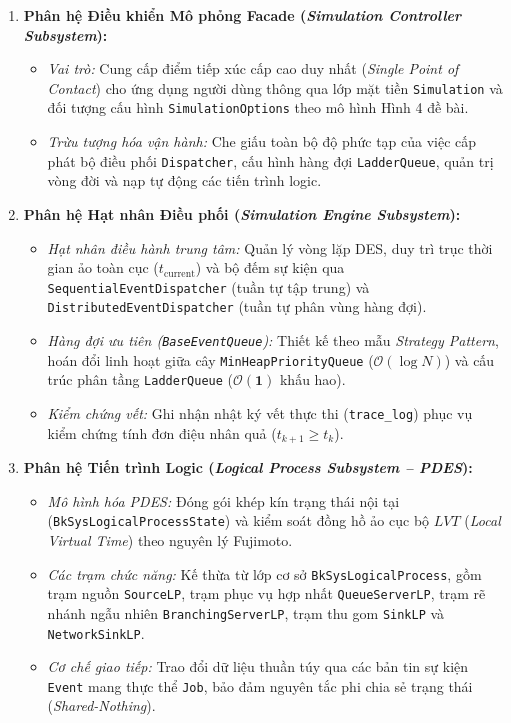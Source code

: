 \begin{enumerate}[leftmargin=1.8em, itemsep=3.5pt]
\item \textbf{Phân hệ Điều khiển Mô phỏng Facade (\textit{Simulation Controller Subsystem}):}
\begin{itemize}[leftmargin=1.2em, itemsep=1.5pt]
\item \textit{Vai trò:} Cung cấp điểm tiếp xúc cấp cao duy nhất (\textit{Single Point of Contact}) cho ứng dụng người dùng thông qua lớp mặt tiền \texttt{Simulation} và đối tượng cấu hình \texttt{SimulationOptions} theo mô hình Hình 4 đề bài.
\item \textit{Trừu tượng hóa vận hành:} Che giấu toàn bộ độ phức tạp của việc cấp phát bộ điều phối \texttt{Dispatcher}, cấu hình hàng đợi \texttt{LadderQueue}, quản trị vòng đời và nạp tự động các tiến trình logic.
\end{itemize}

\item \textbf{Phân hệ Hạt nhân Điều phối (\textit{Simulation Engine Subsystem}):}
\begin{itemize}[leftmargin=1.2em, itemsep=1.5pt]
\item \textit{Hạt nhân điều hành trung tâm:} Quản lý vòng lặp DES, duy trì trục thời gian ảo toàn cục ($t_{\text{current}}$) và bộ đếm sự kiện qua \texttt{SequentialEventDispatcher} (tuần tự tập trung) và \texttt{DistributedEventDispatcher} (tuần tự phân vùng hàng đợi).
\item \textit{Hàng đợi ưu tiên (\texttt{BaseEventQueue}):} Thiết kế theo mẫu \textit{Strategy Pattern}, hoán đổi linh hoạt giữa cây \texttt{MinHeapPriorityQueue} ($\mathcal{O}(\log N)$) và cấu trúc phân tầng \texttt{LadderQueue} ($\bm{\mathcal{O}(1)}$ khấu hao).
\item \textit{Kiểm chứng vết:} Ghi nhận nhật ký vết thực thi (\texttt{trace\_log}) phục vụ kiểm chứng tính đơn điệu nhân quả ($t_{k+1} \ge t_k$).
\end{itemize}

\item \textbf{Phân hệ Tiến trình Logic (\textit{Logical Process Subsystem -- PDES}):}
\begin{itemize}[leftmargin=1.2em, itemsep=1.5pt]
\item \textit{Mô hình hóa PDES:} Đóng gói khép kín trạng thái nội tại (\texttt{BkSysLogicalProcessState}) và kiểm soát đồng hồ ảo cục bộ $LVT$ (\textit{Local Virtual Time}) theo nguyên lý Fujimoto.
\item \textit{Các trạm chức năng:} Kế thừa từ lớp cơ sở \texttt{BkSysLogicalProcess}, gồm trạm nguồn \texttt{SourceLP}, trạm phục vụ hợp nhất \texttt{QueueServerLP}, trạm rẽ nhánh ngẫu nhiên \texttt{BranchingServerLP}, trạm thu gom \texttt{SinkLP} và \texttt{NetworkSinkLP}.
\item \textit{Cơ chế giao tiếp:} Trao đổi dữ liệu thuần túy qua các bản tin sự kiện \texttt{Event} mang thực thể \texttt{Job}, bảo đảm nguyên tắc phi chia sẻ trạng thái (\textit{Shared-Nothing}).
\end{itemize}


\end{enumerate}

